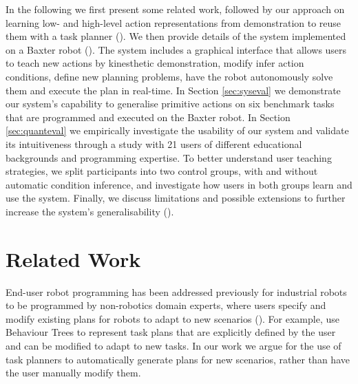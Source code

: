 In the following we first present some related work, followed by our approach on learning low- and high-level action representations from demonstration to reuse them with a task planner ().
We then provide details of the system implemented on a Baxter robot (). 
The system includes a graphical interface that allows users to teach new actions by kinesthetic demonstration, modify infer action conditions, define new planning problems, have the robot autonomously solve them and execute the plan in real-time.
In Section \ref{sec:syseval} we demonstrate our system's capability to generalise primitive actions on six benchmark tasks that are programmed and executed on the Baxter robot.
In Section \ref{sec:quanteval} we empirically investigate the usability of our system and validate its intuitiveness through a study with 21 users of different educational backgrounds and programming expertise.
To better understand user teaching strategies, we split participants into two control groups, with and without automatic condition inference, and investigate how users in both groups learn and use the system.
Finally, we discuss limitations and possible extensions to further increase the system's generalisability ().

\section{Related Work}
\label{sec:relatedwork}
End-user robot programming has been addressed previously for industrial robots to be programmed by non-robotics domain experts, where users specify and modify existing plans for robots to adapt to new scenarios (\cite{paxton2017costar,perzylo2016intuitive,stenmark2017simplified}).
For example, \citet{paxton2017costar} use Behaviour Trees to represent task plans that are explicitly defined by the user and can be modified to adapt to new tasks.
In our work we argue for the use of task planners to automatically generate plans for new scenarios, rather than have the user manually modify them.

